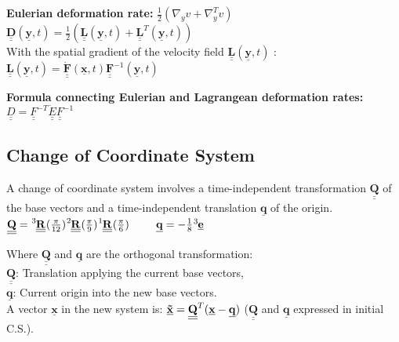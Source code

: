 \smallskip
\textbf{Eulerian deformation rate:} $\frac{1}{2}(\nabla_y v + \nabla_y^T v)$ \\

$ \underline{\underline{\mathbf{D}}}(\underline{\mathbf{y}},t) = \frac{1}{2}( \underline{\underline{\mathbf{L}}}(\underline{\mathbf{y}},t) +  \underline{\underline{\mathbf{L}}}^T(\underline{\mathbf{y}},t))$ \\
With the spatial gradient of the velocity field $\underline{\underline{\mathbf{L}}}(\underline{\mathbf{y}},t)$ :\\
$\underline{\underline{\mathbf{L}}}(\underline{\mathbf{y}},t) = \underline{\underline{\mathbf{\dot{F}}}}(\underline{\mathbf{x}},t) \underline{\underline{\mathbf{F}}}^{-1}(\underline{\mathbf{y}},t) $

\textbf{Formula connecting Eulerian and Lagrangean deformation rates:} \\
$ \underline{\underline{D}} = \underline{\underline{F}}^{-T} \underline{\underline{\dot{E}}}  \underline{\underline{F}}^{-1}  $ \\




\subsection*{Change of Coordinate System}
\smallskip

A change of coordinate system involves a time-independent transformation $\underline{\underline{\mathbf{Q}}}$ of the base vectors and a time-independent translation $\underline{\mathbf{q}}$ of the origin. \\

$\underline{\mathbf{\underline{Q}}} = \tensor[^3]{\underline{\mathbf{\underline{R}}}}{}(\frac{\pi}{12}) \tensor[^2]{\underline{\mathbf{\underline{R}}}}{}(\frac{\pi}{9}) \tensor[^1]{\underline{\underline{\mathbf{R}}}}{}(\frac{\pi}{6})$
$ \qquad \underline{\mathbf{q}} = - \frac{1}{8} \tensor[^3]{\underline{\mathbf{e}}}{}$

Where $\underline{\mathbf{\underline{Q}}}$ and ${\mathbf{\underline{q}}}$ are the orthogonal transformation: \\
$\underline{\mathbf{\underline{Q}}}$: Translation applying the current base vectors, \\
${\mathbf{\underline{q}}}$: Current origin into the new base vectors. \\

A vector $\underline{\mathbf{x}}$ in the new system is: $\underline{\mathbf{\tilde{x}}} = \tensor[]{\underline{\underline{\mathbf{Q}}}}{^T}(\underline{\mathbf{x}} - \underline{\mathbf{q}})$
($\underline{\mathbf{\underline{Q}}}$ and ${\mathbf{\underline{q}}}$ expressed in initial C.S.).

